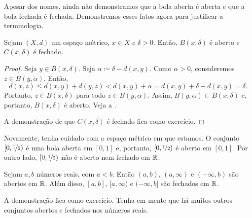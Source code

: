 Apesar dos nomes,
ainda não demonstramos que a bola aberta é aberta e que a bola fechada é
fechada. Demonstremos esses fatos agora para justificar a terminologia.

\begin{prop} \label{prop:topology:ballsopenclosed}
Sejam $(X,d)$ um espaço métrico, $x \in X$ e $\delta > 0$. Então,
$B(x,\delta)$ é aberto e $C(x,\delta)$ é fechado.
\end{prop}

\begin{proof}
Seja $y \in B(x,\delta)$. Seja $\alpha \coloneqq \delta-d(x,y)$. Como
$\alpha > 0$, consideremos $z \in B(y,\alpha)$. Então,
\begin{equation*}
d(x,z) \leq d(x,y) + d(y,z) < d(x,y) + \alpha = d(x,y) + \delta-d(x,y) =
\delta .
\end{equation*}
Portanto, $z \in B(x,\delta)$ para todo $z \in B(y,\alpha)$. Assim,
$B(y,\alpha) \subset B(x,\delta)$ e, portanto,
$B(x,\delta)$ é aberto. Veja a .

\begin{myfigureht}
\caption{Demonstração de que $B(x,\delta)$ é aberto: $B(y,\alpha) \subset
B(x,\delta)$, com a desigualdade triangular ilustrada.\label{fig:ballisopen}}
\end{myfigureht}

A demonstração de que $C(x,\delta)$ é fechado fica como exercício.
\end{proof}

Novamente, tenha cuidado com o espaço métrico em que estamos.
O conjunto $[0,\nicefrac{1}{2})$ é uma bola aberta em $[0,1]$ e, portanto,
$[0,\nicefrac{1}{2})$ é aberto em $[0,1]$. Por outro lado,
$[0,\nicefrac{1}{2})$ não é aberto nem fechado em ${\mathbb{R}}$.

\begin{prop} \label{prop:topology:intervals:openclosed}
Sejam $a,b$ números reais, com $a < b$. Então $(a,b)$, $(a,\infty)$ e
$(-\infty,b)$ são abertos em ${\mathbb{R}}$.
Além disso, $[a,b]$, $[a,\infty)$ e $(-\infty,b]$ são fechados em ${\mathbb{R}}$.
\end{prop}

A demonstração fica como exercício. Tenha em mente que há muitos outros
conjuntos abertos e fechados nos números reais. %

